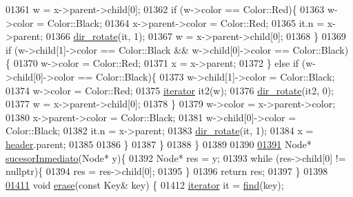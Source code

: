 \begin{DoxyCode}
01361             w = x->parent->child[0];
01362             \textcolor{keywordflow}{if} (w->color == Color::Red)\{
01363                 w->color = Color::Black;
01364                 x->parent->color = Color::Red;
01365                 it.n = x->parent;
01366                 \hyperlink{classaed2_1_1map_a94f2862ada0c9ed4f4457eac42ea8f23_a94f2862ada0c9ed4f4457eac42ea8f23}{dir_rotate}(it, 1);
01367                 w = x->parent->child[0];
01368             \}
01369             \textcolor{keywordflow}{if} (w->child[1]->color == Color::Black && w->child[0]->color == 
      Color::Black)\{
01370                 w->color = Color::Red;
01371                 x = x->parent;
01372             \} \textcolor{keywordflow}{else} \textcolor{keywordflow}{if} (w->child[0]->color == Color::Black)\{
01373                 w->child[1]->color = Color::Black;
01374                 w->color = Color::Red;
01375                 \hyperlink{classaed2_1_1iterator}{iterator} it2(w);
01376                 \hyperlink{classaed2_1_1map_a94f2862ada0c9ed4f4457eac42ea8f23_a94f2862ada0c9ed4f4457eac42ea8f23}{dir_rotate}(it2, 0);
01377                 w = x->parent->child[0];
01378             \}
01379             w->color = x->parent->color;
01380             x->parent->color = Color::Black;
01381             w->child[0]->color = Color::Black;
01382             it.n = x->parent;
01383             \hyperlink{classaed2_1_1map_a94f2862ada0c9ed4f4457eac42ea8f23_a94f2862ada0c9ed4f4457eac42ea8f23}{dir_rotate}(it, 1);
01384             x = \hyperlink{classaed2_1_1map_a92d93f905c8ad73fba18fdc7e8915cce_a92d93f905c8ad73fba18fdc7e8915cce}{header}.parent;
01385 
01386         \}
01387 \}
01388 \}
01389 
01390 
\hypertarget{map3_8h_source_l01391}{}\hyperlink{classaed2_1_1map_a51169c7d557dc5cf26eac59e6e5e6d98_a51169c7d557dc5cf26eac59e6e5e6d98}{01391} Node* \hyperlink{classaed2_1_1map_a51169c7d557dc5cf26eac59e6e5e6d98_a51169c7d557dc5cf26eac59e6e5e6d98}{sucesorInmediato}(Node* y)\{
01392     Node* res = y;
01393     \textcolor{keywordflow}{while} (res->child[0] != \textcolor{keyword}{nullptr})\{
01394         res = res->child[0];
01395     \}
01396     \textcolor{keywordflow}{return} res;
01397 \}
01398 
\hypertarget{map3_8h_source_l01411}{}\hyperlink{classaed2_1_1map_a2ffadb42cd5f0bc7b3752ff159b75334_a2ffadb42cd5f0bc7b3752ff159b75334}{01411}     \textcolor{keywordtype}{void} \hyperlink{classaed2_1_1map_a2ffadb42cd5f0bc7b3752ff159b75334_a2ffadb42cd5f0bc7b3752ff159b75334}{erase}(\textcolor{keyword}{const} Key& key) \{
01412         \hyperlink{classaed2_1_1iterator}{iterator} it = \hyperlink{classaed2_1_1map_afd0fc1a8234888e61e0e615de7e245b8_afd0fc1a8234888e61e0e615de7e245b8}{find}(key);

\end{DoxyCode}
